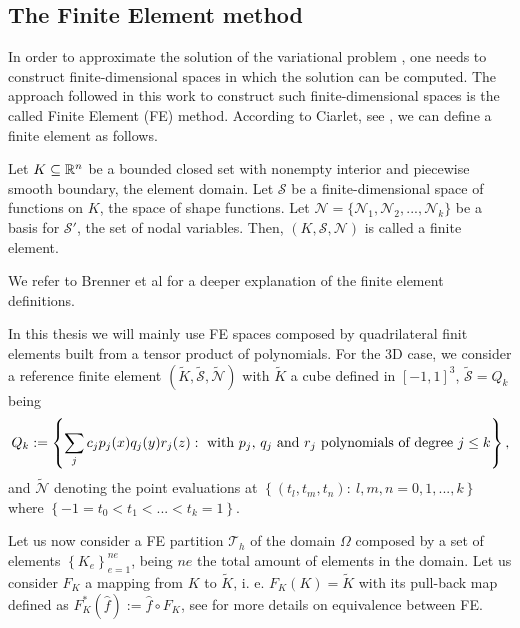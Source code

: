\subsection{The Finite Element method}
\label{subsec-variational_finite_element}
In order to approximate the solution of the variational problem , one needs to construct finite-dimensional spaces in which the solution can be computed. The approach followed in this work to construct such finite-dimensional spaces is the called Finite Element (FE) method. According to Ciarlet, see \cite{ciarlet}, we can define a finite element as follows.

Let $ K\subseteq\mathbb{R}^n $ be a bounded closed set with nonempty interior and piecewise smooth boundary, the element domain. Let $ \mathcal{S} $ be a finite-dimensional space of functions on $ K $, the space of shape functions. Let $ \mathcal{N}=\{\mathcal{N}_1,\mathcal{N}_2,...,\mathcal{N}_k\} $ be a basis for $ \mathcal{S}' $, the set of nodal variables. Then, $ (K,\mathcal{S},\mathcal{N}) $ is called a finite element.

We refer to Brenner et al \cite{Brenner} for a deeper explanation of the finite element definitions.

In this thesis we will mainly use FE spaces composed by quadrilateral finit elements built from a tensor product of polynomials. For the 3D case, we consider a reference finite element $ (\widetilde{K},\widetilde{\mathcal{S}},\widetilde{\mathcal{N}}) $ with $ \widetilde{K} $ a cube defined in $ [-1,1]^3 $, $ \widetilde{\mathcal{S}}=Q_k $ being
$$ Q_k:=\left\{\sum_jc_jp_j(x)q_j(y)r_j(z):\mbox{ with $ p_j $, $ q_j $ and $ r_j $ polynomials of degree $j \leq k $}\right\}, $$
and $ \widetilde{\mathcal{N}} $ denoting the point evaluations at $ \left\{(t_l,t_m,t_n):\ l,m,n=0,1,...,k \right\} $ where $\left\{-1 = t_0 < t_1 < ... < t_k = 1 \right\}$.

Let us now consider a FE partition $ \mathcal{T}_h $ of the domain $ \Omega $ composed by a set of elements $ \left\{K_e\right\}_{e=1}^{ne} $, being $ ne $ the total amount of elements in the domain. Let us consider $ F_K $ a mapping from $ K $ to $ \widetilde{K} $, i. e. $ F_K(K)=\widetilde{K} $ with its pull-back map defined as $ F^*_K(\hat{f}):=\hat{f}\circ F_K $, see \cite{Ciarlet&Raviart1972,brenner} for more details on equivalence between FE.

